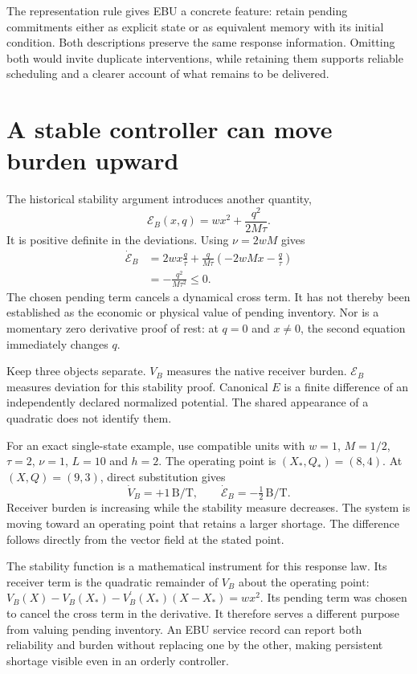 The representation rule gives EBU a concrete feature: retain pending commitments either as explicit state or as equivalent memory with its initial condition. Both descriptions preserve the same response information. Omitting both would invite duplicate interventions, while retaining them supports reliable scheduling and a clearer account of what remains to be delivered.

\section{A stable controller can move burden upward}
The historical stability argument introduces another quantity,
\begin{equation}\label{eq:tank-storage}
 \mathcal E_B(x,q)=wx^2+\frac{q^2}{2M\tau}.
\end{equation}
It is positive definite in the deviations. Using $\nu=2wM$ gives
\begin{align}\label{eq:tank-storage-rate}
 \dot{\mathcal E}_B
 &=2wx\frac q\tau+\frac q{M\tau}
       \left(-2wMx-\frac q\tau\right)\nonumber\\
 &=-\frac{q^2}{M\tau^2}\leq0.
\end{align}
The chosen pending term cancels a dynamical cross term. It has not thereby been established as the economic or physical value of pending inventory. Nor is a momentary zero derivative proof of rest: at $q=0$ and $x\ne0$, the second equation immediately changes $q$.

Keep three objects separate. $V_B$ measures the native receiver burden. $\mathcal E_B$ measures deviation for this stability proof. Canonical $E$ is a finite difference of an independently declared normalized potential. The shared appearance of a quadratic does not identify them.

For an exact single-state example, use compatible units with $w=1$, $M=1/2$, $\tau=2$, $\nu=1$, $L=10$ and $h=2$. The operating point is $(X_*,Q_*)=(8,4)$. At $(X,Q)=(9,3)$, direct substitution gives
\begin{equation}\label{eq:tank-state-counterexample}
 \dot V_B=+1\,\mathrm B/\mathrm T,
 \qquad \dot{\mathcal E}_B=-\tfrac12\,\mathrm B/\mathrm T.
\end{equation}
Receiver burden is increasing while the stability measure decreases. The system is moving toward an operating point that retains a larger shortage. The difference follows directly from the vector field at the stated point.

The stability function is a mathematical instrument for this response law. Its receiver term is the quadratic remainder of $V_B$ about the operating point: $V_B(X)-V_B(X_*)-V_B^\prime(X_*)(X-X_*)=wx^2$. Its pending term was chosen to cancel the cross term in the derivative. It therefore serves a different purpose from valuing pending inventory. An EBU service record can report both reliability and burden without replacing one by the other, making persistent shortage visible even in an orderly controller.

